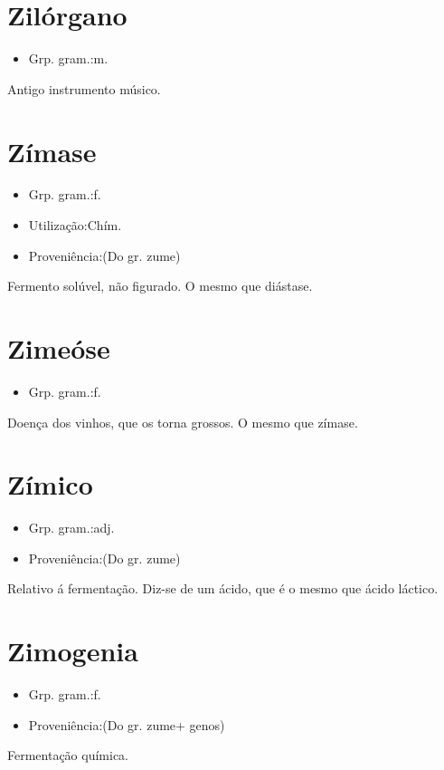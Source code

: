 \section{Zilórgano}
\begin{itemize}
\item {Grp. gram.:m.}
\end{itemize}
Antigo instrumento músico.
\section{Zímase}
\begin{itemize}
\item {Grp. gram.:f.}
\end{itemize}
\begin{itemize}
\item {Utilização:Chím.}
\end{itemize}
\begin{itemize}
\item {Proveniência:(Do gr. \textunderscore zume\textunderscore )}
\end{itemize}
Fermento solúvel, não figurado.
O mesmo que \textunderscore diástase\textunderscore .
\section{Zimeóse}
\begin{itemize}
\item {Grp. gram.:f.}
\end{itemize}
Doença dos vinhos, que os torna grossos.
O mesmo que \textunderscore zímase\textunderscore .
\section{Zímico}
\begin{itemize}
\item {Grp. gram.:adj.}
\end{itemize}
\begin{itemize}
\item {Proveniência:(Do gr. \textunderscore zume\textunderscore )}
\end{itemize}
Relativo á fermentação.
Diz-se de um ácido, que é o mesmo que ácido láctico.
\section{Zimogenia}
\begin{itemize}
\item {Grp. gram.:f.}
\end{itemize}
\begin{itemize}
\item {Proveniência:(Do gr. \textunderscore zume\textunderscore  + \textunderscore genos\textunderscore )}
\end{itemize}
Fermentação química.
